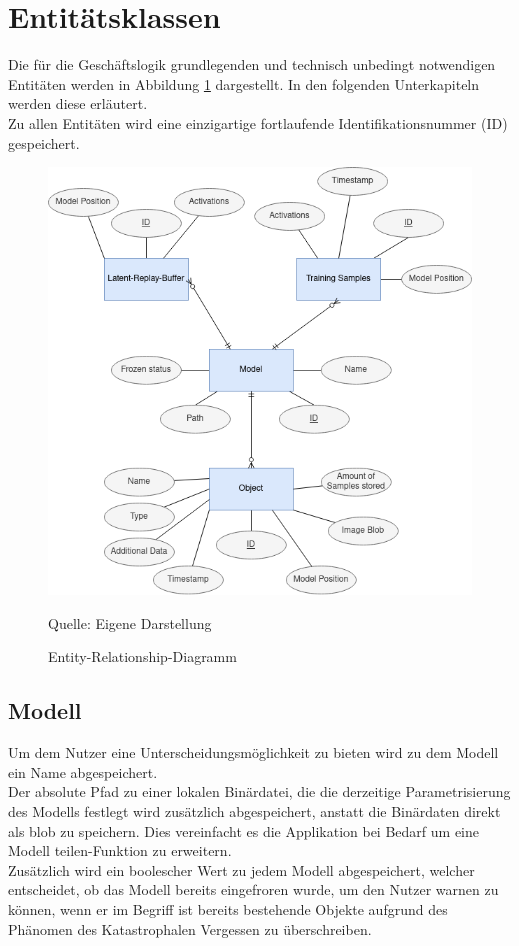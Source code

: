 \documentclass[oneside]{ausarbeitung}
\begin{document}
\section{Entitätsklassen}
Die für die Geschäftslogik grundlegenden und technisch unbedingt notwendigen Entitäten werden in Abbildung \ref{fig:er-diagram} dargestellt. In den folgenden Unterkapiteln werden diese erläutert.\\
Zu allen Entitäten wird eine einzigartige fortlaufende Identifikationsnummer (ID) gespeichert.
\begin{figure}[hptb]
	\centering
	\includegraphics[height=0.6\textheight]{images/er-diagram.png}
	\caption{Entity-Relationship-Diagramm} Quelle: Eigene Darstellung
	\label{fig:er-diagram}
\end{figure}

\subsection{Modell}
Um dem Nutzer eine Unterscheidungsmöglichkeit zu bieten wird zu dem Modell ein Name abgespeichert.\\
Der absolute Pfad zu einer lokalen Binärdatei, die die derzeitige Parametrisierung des Modells festlegt wird zusätzlich abgespeichert, anstatt die Binärdaten direkt als \ac{blob} zu speichern. Dies vereinfacht es die Applikation bei Bedarf um eine \glqq Modell teilen\grqq-Funktion zu erweitern. \\
Zusätzlich wird ein boolescher Wert zu jedem Modell abgespeichert, welcher entscheidet, ob das Modell bereits eingefroren wurde, um den Nutzer warnen zu können, wenn er im Begriff ist bereits bestehende Objekte aufgrund des Phänomen des Katastrophalen Vergessen zu überschreiben.
\end{document}
